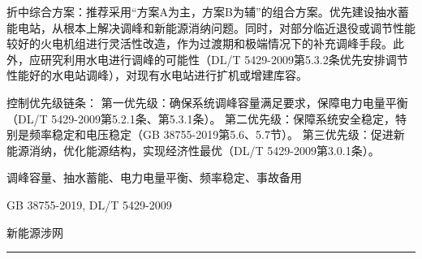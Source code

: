 \documentclass[12pt,a4paper]{ctexart}
\begin{document}
\begin{description}[leftmargin=1.5em,style=nextline,font=\normalfont]
折中综合方案：推荐采用“方案A为主，方案B为辅”的组合方案。优先建设抽水蓄能电站，从根本上解决调峰和新能源消纳问题。同时，对部分临近退役或调节性能较好的火电机组进行灵活性改造，作为过渡期和极端情况下的补充调峰手段。此外，应研究利用水电进行调峰的可能性（DL/T 5429-2009第5.3.2条优先安排调节性能好的水电站调峰），对现有水电站进行扩机或增建库容。

控制优先级链条：
第一优先级：确保系统调峰容量满足要求，保障电力电量平衡（DL/T 5429-2009第5.2.1条、第5.3.1条）。
第二优先级：保障系统安全稳定，特别是频率稳定和电压稳定（GB 38755-2019第5.6、5.7节）。
第三优先级：促进新能源消纳，优化能源结构，实现经济性最优（DL/T 5429-2009第3.0.1条）。
  \item[KW:] 调峰容量、抽水蓄能、电力电量平衡、频率稳定、事故备用
  \item[Std:] GB 38755-2019, DL/T 5429-2009
  \item[Topic:] 新能源涉网
\end{description}
\vspace{4pt}
\hrule\vspace{6pt}
\end{document}
